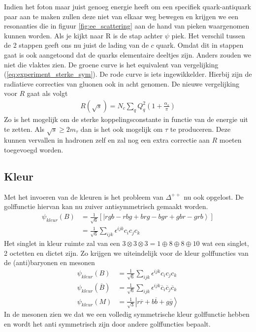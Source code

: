 \documentclass[../main.tex]{subfiles}
\begin{document}
Indien het foton maar juist genoeg energie heeft om een specifiek quark-antiquark paar aan te maken zullen deze niet van elkaar weg bewegen en krijgen we een resonanties die in figuur \ref{fig:ee_scattering} aan de hand van pieken waargenomen kunnen worden. Als je kijkt naar R is de stap achter $\psi$ piek. Het verschil tussen de 2 stappen geeft ons nu juist de lading van de $c$ quark. Omdat dit in stappen gaat is ook aangetoond dat de quarks elementaire deeltjes zijn. Anders zouden we niet die vlaktes zien. De groene curve is het equivalent van vergelijking (\ref{eq:experiment_sterke_sym}). De rode curve is iets ingewikkelder. Hierbij zijn de radiatieve correcties van gluonen ook in acht genomen. De nieuwe vergelijking voor $R$ gaat als volgt
\begin{equation}
    \begin{aligned}
        \label{eq:experiment_sterke_sym_extended}
        R(\sqrt{s}) = N_c\sum_q Q_q^2 (1+\frac{\alpha_s}{\pi})
    \end{aligned}
\end{equation}
Zo is het mogelijk om de sterke koppelingsconstante in functie van de energie uit te zetten. Als $\sqrt{s}\geq 2m_\tau$ dan is het ook mogelijk om $\tau$ te produceren. Deze kunnen vervallen in hadronen zelf en zal nog een extra correctie aan $R$ moeten toegevoegd worden.

\subsection{Kleur}%
\label{sub:kleur}

Met het invoeren van de kleuren is het probleem van $\Delta^{++}$ nu ook opgelost. De golffunctie hiervan kan nu zuiver antisymmetrisch gemaakt worden.
\begin{equation}
    \begin{aligned}
        \label{eq:golffunctie_baryon}
        \psi_{kleur}(B) &= \frac{1}{\sqrt{6}} [\left|rgb-rbg+brg-bgr+gbr-grb\right>]\\
                        &= \frac{1}{\sqrt{6}} \sum_{ijk} \epsilon^{ijk}c_ic_jc_k
    \end{aligned}
\end{equation}
Het singlet in kleur ruimte zal van een $3\otimes 3\otimes 3 = 1\oplus 8\oplus 8\oplus 10$ wat een singlet, 2 octetten en dictet zijn. Zo krijgen we uiteindelijk voor de kleur golffuncties van de (anti)baryonen en mesonen
\begin{equation}
    \begin{aligned}
        \label{eq:kleur_golffunctie}
        \psi_{kleur}(B) &= \frac{1}{\sqrt{6}} \sum_{ijk} \epsilon^{ijk}c_ic_jc_k\\
        \psi_{kleur}(\overline B) &= \frac{1}{\sqrt{6}} \sum_{ijk} \epsilon^{ijk}\overline c_i \overline c_j\overline c_k\\
        \psi_{kleur}(M) &= \frac{1}{\sqrt{3}} \left|r\overline r + b\overline b + g\overline g \right>
    \end{aligned}
\end{equation}
In de mesonen zien we dat we een volledig symmetrische kleur golffunctie hebben en wordt het anti symmetrisch zijn door andere golffuncties bepaalt.
\end{document}
